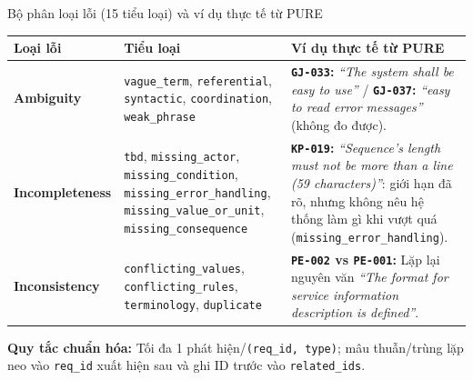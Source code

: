 \documentclass[aspectratio=169,10pt]{beamer}
\begin{document}
\begin{frame}{Bộ phân loại lỗi (15 tiểu loại) và ví dụ thực tế từ PURE}
  \small
  \begin{tabular}{p{2.35cm}p{3.8cm}p{6.05cm}}
    \toprule
    \textbf{Loại lỗi} & \textbf{Tiểu loại} & \textbf{Ví dụ thực tế từ PURE} \\
    \midrule
    \textbf{Ambiguity} & \texttt{vague\_term}, \texttt{referential}, \texttt{syntactic}, \texttt{coordination}, \texttt{weak\_phrase} & \textbf{\texttt{GJ-033}:} \textit{``The system shall be easy to use''} / \textbf{\texttt{GJ-037}:} \textit{``easy to read error messages''} (không đo được). \\
    \midrule
    \textbf{Incompleteness} & \texttt{tbd}, \texttt{missing\_actor}, \texttt{missing\_condition}, \texttt{missing\_error\_handling}, \texttt{missing\_value\_or\_unit}, \texttt{missing\_consequence} & \textbf{\texttt{KP-019}:} \textit{``Sequence's length must not be more than a line (59 characters)''}: giới hạn đã rõ, nhưng không nêu hệ thống làm gì khi vượt quá (\texttt{missing\_error\_handling}). \\
    \midrule
    \textbf{Inconsistency} & \texttt{conflicting\_values}, \texttt{conflicting\_rules}, \texttt{terminology}, \texttt{duplicate} & \textbf{\texttt{PE-002} vs \texttt{PE-001}:} Lặp lại nguyên văn \textit{``The format for service information description is defined''}. \\
    \bottomrule
  \end{tabular}
  \vspace{0.15cm}
  {\footnotesize \textbf{Quy tắc chuẩn hóa:} Tối đa 1 phát hiện/\texttt{(req\_id, type)}; mâu thuẫn/trùng lặp neo vào \texttt{req\_id} xuất hiện sau và ghi ID trước vào \texttt{related\_ids}.}
\end{frame}
\end{document}
